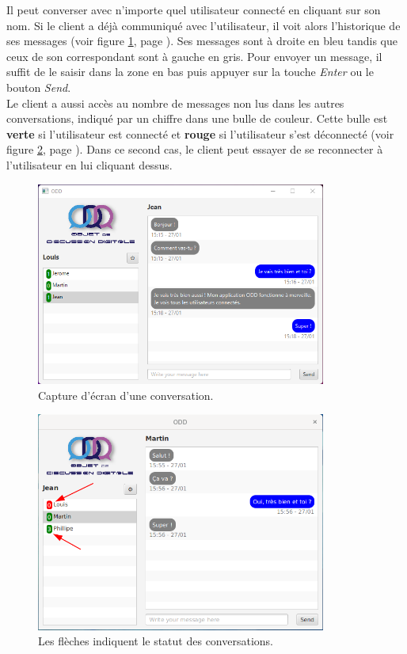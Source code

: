 \documentclass[12pt, a4paper]{article}
\begin{document}
    Il peut converser avec n'importe quel utilisateur connecté en cliquant sur son nom. Si le client a déjà communiqué avec l'utilisateur, il voit alors l'historique de ses messages (voir figure \ref{mc}, page \pageref{mc}). Ses messages sont à droite en bleu tandis que ceux de son correspondant sont à gauche en gris. Pour envoyer un message, il suffit de le saisir dans la zone en bas puis appuyer sur la touche \textit{Enter} ou le bouton \textit{Send}.\\
    
    Le client a aussi accès au nombre de messages non lus dans les autres conversations, indiqué par un chiffre dans une bulle de couleur. Cette bulle est \textbf{verte} si l'utilisateur est connecté et \textbf{rouge} si l'utilisateur s'est déconnecté (voir figure \ref{do2}, page \pageref{do2}). Dans ce second cas, le client peut essayer de se reconnecter à l'utilisateur en lui cliquant dessus.\\
    
    \begin{figure}[!htp]
        \centering
        \includegraphics[width=0.85\textwidth]{img/mw/mc_window.png}
        \caption{Capture d'écran d'une conversation.}
        \label{mc}
    \end{figure}
    
    \begin{figure}[!htp]
        \centering
        \includegraphics[width=0.85\textwidth]{img/mw/do2_window.png}
        \caption{Les flèches indiquent le statut des conversations.}
        \label{do2}
    \end{figure}
    
\end{document}
